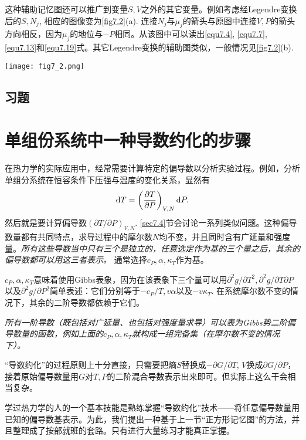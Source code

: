 这种辅助记忆图还可以推广到变量$S, V$之外的其它变量。例如考虑经Legendre变换后的$S, N_j$, 相应的图像变为\ref{fig7.2}(a). 连接$N_j$与$\mu_j$的箭头与原图中连接$V, P$的箭头方向相反，因为$\mu_j$的地位与$-P$相同。从该图中可以读出\eqref{equ7.4}, \eqref{equ7.7}, \eqref{equ7.13}和\eqref{equ7.19}式。其它Legendre变换的辅助图类似，一般情况见\ref{fig7.2}(b).

{
	\centering
	\texttt{[image: fig7\_2.png]}
	\figcaption{}
	\label{fig7.2}
}

\subsection*{习题}


\section{单组份系统中一种导数约化的步骤}
\label{sec7.3}
在热力学的实际应用中，经常需要计算特定的偏导数以分析实验过程。例如，分析单组分系统在恒容条件下压强与温度的变化关系，显然有
\begin{equation}
	\mathrm{d} T = \left( \frac{\partial T}{\partial P} \right)_{V, N} \mathrm{d} P.
\label{equ7.32}
\end{equation}
然后就是要计算偏导数$(\partial T / \partial P)_{V, N}$. \ref{sec7.4}节会讨论一系列类似问题。这种偏导数量都有共同特点，求导过程中的摩尔数$N$均不变，并且同时含有广延量和强度量。{\it 所有这些导数当中只有三个是独立的，任意选定作为基的三个量之后，其余的偏导数都可以用这三者表示。} 通常选择$c_P, \alpha, \kappa_T$作为基。

$c_P, \alpha, \kappa_T$意味着使用Gibbs表象，因为在该表象下三个量可以用$\partial^2 g / \partial T^2, \partial^2 g / \partial T \partial P$以及$\partial^2 g / \partial P^2$简单表述：它们分别等于$-c_P / T, v\alpha$以及$-v \kappa_T$. 在系统摩尔数不变的情况下，其余的二阶导数都依赖于它们。

{\it 所有一阶导数（既包括对广延量、也包括对强度量求导）可以表为Gibbs势二阶偏导数量的函数，例如上面的$c_P, \alpha, \kappa_T$就构成一组完备集（在摩尔数不变的情况下）。}

“导数约化”的过程原则上十分直接，只需要把熵$S$替换成$-\partial G / \partial T$, $V$换成$\partial G / \partial P$，接着原始偏导数量用$G$对$T, P$的二阶混合导数表示出来即可。但实际上这么干会相当复杂。

学过热力学的人的一个基本技能是熟练掌握“导数约化”技术——将任意偏导数量用已知的偏导数基表示。为此，我们提出一种基于上一节“正方形记忆图”的方法，并且整理成了按部就班的套路。只有进行大量练习才能真正掌握。

